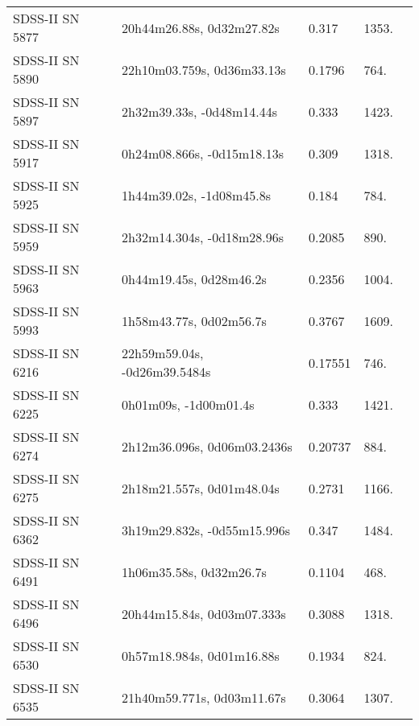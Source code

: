 \begin{longtable}{lllll}
  SDSS-II SN 5877 &      20h44m26.88s, 0d32m27.82s &    0.317 &          1353. &    \citet{2011ApJ...738..162S} \\
  SDSS-II SN 5890 &     22h10m03.759s, 0d36m33.13s &   0.1796 &           764. &    \citet{2011ApJ...738..162S} \\
  SDSS-II SN 5897 &      2h32m39.33s, -0d48m14.44s &    0.333 &          1423. &    \citet{2011ApJ...738..162S} \\
  SDSS-II SN 5917 &     0h24m08.866s, -0d15m18.13s &    0.309 &          1318. &    \citet{2011ApJ...738..162S} \\
  SDSS-II SN 5925 &       1h44m39.02s, -1d08m45.8s &    0.184 &           784. &    \citet{2011ApJ...738..162S} \\
  SDSS-II SN 5959 &     2h32m14.304s, -0d18m28.96s &   0.2085 &           890. &    \citet{2011ApJ...738..162S} \\
  SDSS-II SN 5963 &        0h44m19.45s, 0d28m46.2s &   0.2356 &          1004. &    \citet{2011ApJ...738..162S} \\
  SDSS-II SN 5993 &        1h58m43.77s, 0d02m56.7s &   0.3767 &          1609. &    \citet{2011ApJ...738..162S} \\
  SDSS-II SN 6216 &   22h59m59.04s, -0d26m39.5484s &  0.17551 &           746. &    \citet{2016SDSSD.C...0000:} \\
  SDSS-II SN 6225 &          0h01m09s, -1d00m01.4s &    0.333 &          1421. &    \citet{2010ApJ...713.1026D} \\
  SDSS-II SN 6274 &    2h12m36.096s, 0d06m03.2436s &  0.20737 &           884. &    \citet{2016SDSSD.C...0000:} \\
  SDSS-II SN 6275 &      2h18m21.557s, 0d01m48.04s &   0.2731 &          1166. &    \citet{2011ApJ...738..162S} \\
  SDSS-II SN 6362 &    3h19m29.832s, -0d55m15.996s &    0.347 &          1484. &    \citet{2011ApJ...738..162S} \\
  SDSS-II SN 6491 &        1h06m35.58s, 0d32m26.7s &   0.1104 &           468. &    \citet{2012ApJ...755...61S} \\
  SDSS-II SN 6496 &     20h44m15.84s, 0d03m07.333s &   0.3088 &          1318. &    \citet{2011ApJ...738..162S} \\
  SDSS-II SN 6530 &      0h57m18.984s, 0d01m16.88s &   0.1934 &           824. &    \citet{2011ApJ...738..162S} \\
  SDSS-II SN 6535 &     21h40m59.771s, 0d03m11.67s &   0.3064 &          1307. &    \citet{2011ApJ...738..162S} \\

\end{longtable}
